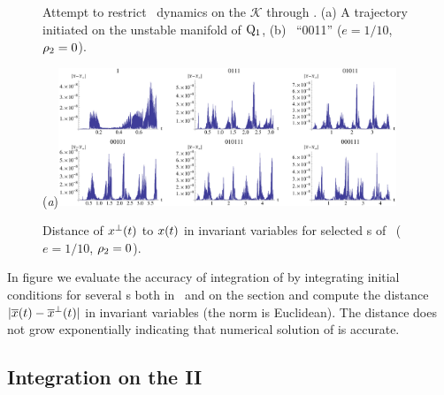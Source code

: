 {\begin{figure}[ht]
\begin{center}
\end{center}
\caption[\CLe\ desymmetrization with transverse integration]{
Attempt to restrict \CLe\ dynamics on the {\slice} $\mathcal{K}$ through
. (a) A trajectory initiated on the unstable
manifold of $\mathrm{Q}_{1}$, (b) \rpo\ ``0011''
($e=1/10$, $\rho_2=0$).
    }
\label{fig:CLEtransv}
\end{figure}

\begin{figure}[ht]
\begin{center}
  (\textit{a})\includegraphics[width=0.9\textwidth, clip=true]{../figs/CLEerrTransv}
\end{center}
\caption[Numerical error in \CLe\ desymmetrization with transverse integration]{
Distance of $x^\perp(t)$ to $x(t)$ in invariant variables
for selected \rpo s of \CLe\,
($e=1/10$, $\rho_2=0$).
    }
\label{fig:CLEerrTransv}
\end{figure}

In figure  we evaluate the accuracy
of integration of  by integrating
initial conditions for several \rpo s both in \statesp\ and
on the section and compute the distance
$|\overline{x}(t)-\overline{x}^\perp(t)|$ in invariant
variables  (the norm is Euclidean). The
distance does not grow exponentially indicating that
numerical solution of  is accurate.

\subsection{Integration on the {\slice} II}

    }%
